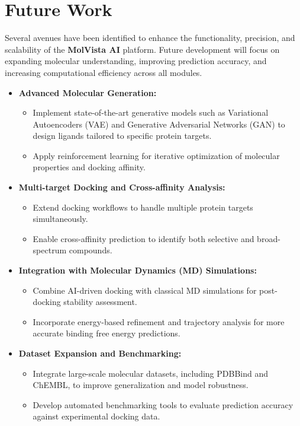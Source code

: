 \documentclass[12pt,a4]{report}
\begin{document}
\section{Future Work}
\vspace{0.2cm}
\hspace{0.3in}Several avenues have been identified to enhance the functionality, precision, and scalability of the \textbf{MolVista AI} platform. Future development will focus on expanding molecular understanding, improving prediction accuracy, and increasing computational efficiency across all modules.

\begin{itemize}
    \item \textbf{Advanced Molecular Generation:}
    \begin{itemize}
        \item Implement state-of-the-art generative models such as Variational Autoencoders (VAE) and Generative Adversarial Networks (GAN) to design ligands tailored to specific protein targets.
        \item Apply reinforcement learning for iterative optimization of molecular properties and docking affinity.
    \end{itemize}

    \item \textbf{Multi-target Docking and Cross-affinity Analysis:}
    \begin{itemize}
        \item Extend docking workflows to handle multiple protein targets simultaneously.
        \item Enable cross-affinity prediction to identify both selective and broad-spectrum compounds.
    \end{itemize}

    \item \textbf{Integration with Molecular Dynamics (MD) Simulations:}
    \begin{itemize}
        \item Combine AI-driven docking with classical MD simulations for post-docking stability assessment.
        \item Incorporate energy-based refinement and trajectory analysis for more accurate binding free energy predictions.
    \end{itemize}

    \item \textbf{Dataset Expansion and Benchmarking:}
    \begin{itemize}
        \item Integrate large-scale molecular datasets, including PDBBind and ChEMBL, to improve generalization and model robustness.
        \item Develop automated benchmarking tools to evaluate prediction accuracy against experimental docking data.
    \end{itemize}


\end{itemize}
\end{document}
